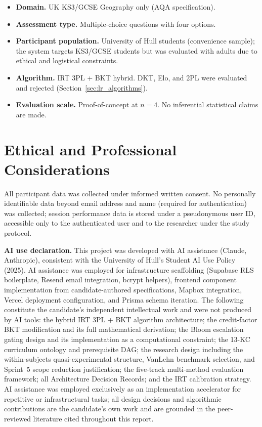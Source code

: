 \begin{itemize}[leftmargin=2em]
  \item \textbf{Domain.} UK KS3/GCSE Geography only (AQA specification).
  \item \textbf{Assessment type.} Multiple-choice questions with four options.
  \item \textbf{Participant population.} University of Hull students
    (convenience sample); the system targets KS3/GCSE students but was
    evaluated with adults due to ethical and logistical constraints.
  \item \textbf{Algorithm.} IRT 3PL + BKT hybrid. DKT, Elo, and 2PL were
    evaluated and rejected (Section~\ref{sec:lr_algorithms}).
  \item \textbf{Evaluation scale.} Proof-of-concept at $n = 4$. No
    inferential statistical claims are made.
\end{itemize}

\section{Ethical and Professional Considerations}
\label{sec:intro_ethics}

All participant data was collected under informed written consent. No
personally identifiable data beyond email address and name (required for
authentication) was collected; session performance data is stored under
a pseudonymous user ID, accessible only to the authenticated user and
to the researcher under the study protocol.

\textbf{AI use declaration.} This project was developed with AI assistance
(Claude, Anthropic), consistent with the University of Hull's Student AI Use
Policy (2025). AI assistance was employed for infrastructure scaffolding
(Supabase RLS boilerplate, Resend email integration, bcrypt helpers), frontend
component implementation from candidate-authored specifications, Mapbox
integration, Vercel deployment configuration, and Prisma schema iteration.
The following constitute the candidate's independent intellectual work and
were not produced by AI tools: the hybrid IRT 3PL + BKT algorithm architecture;
the credit-factor BKT modification and its full mathematical derivation; the
Bloom escalation gating design and its implementation as a computational
constraint; the 13-KC curriculum ontology and prerequisite DAG; the research
design including the within-subjects quasi-experimental structure, VanLehn
benchmark selection, and Sprint~5 scope reduction justification; the five-track
multi-method evaluation framework; all Architecture Decision Records; and the
IRT calibration strategy. AI assistance was employed exclusively as an
implementation accelerator for repetitive or infrastructural tasks; all design
decisions and algorithmic contributions are the candidate's own work and are
grounded in the peer-reviewed literature cited throughout this report.

